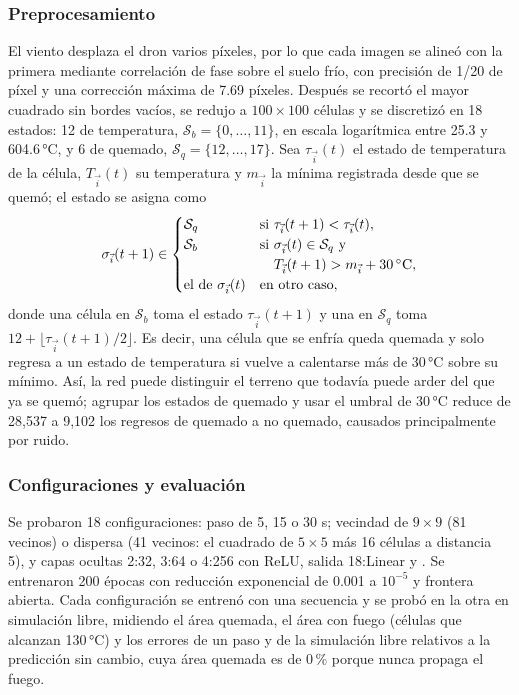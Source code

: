 \subsubsection{Preprocesamiento}
El viento desplaza el dron varios píxeles, por lo que cada imagen se alineó con la primera mediante correlación de fase sobre el suelo frío, con precisión de 1/20 de píxel y una corrección máxima de 7.69 píxeles. Después se recortó el mayor cuadrado sin bordes vacíos, se redujo a $100\times100$ células y se discretizó en 18 estados: 12 de temperatura, $\mathcal{S}_b = \{0, \dots, 11\}$, en escala logarítmica entre 25.3 y 604.6\,°C, y 6 de quemado, $\mathcal{S}_q = \{12, \dots, 17\}$. Sea $\tau_{\vec{i}}(t)$ el estado de temperatura de la célula, $T_{\vec{i}}(t)$ su temperatura y $m_{\vec{i}}$ la mínima registrada desde que se quemó; el estado se asigna como
\begin{equation}
	\sigma_{\vec{i}}(t+1) \in
	\begin{cases}
		\mathcal{S}_q & \text{si } \tau_{\vec{i}}(t+1) < \tau_{\vec{i}}(t), \\
		\mathcal{S}_b & \text{si } \sigma_{\vec{i}}(t) \in \mathcal{S}_q \text{ y} \\
		& \hphantom{\text{si }} T_{\vec{i}}(t+1) > m_{\vec{i}} + 30\,^\circ\mathrm{C}, \\
		\text{el de } \sigma_{\vec{i}}(t) & \text{en otro caso},
	\end{cases}
	\label{eq:flame_estados}
\end{equation}
donde una célula en $\mathcal{S}_b$ toma el estado $\tau_{\vec{i}}(t+1)$ y una en $\mathcal{S}_q$ toma $12 + \lfloor \tau_{\vec{i}}(t+1)/2 \rfloor$. Es decir, una célula que se enfría queda quemada y solo regresa a un estado de temperatura si vuelve a calentarse más de 30\,°C sobre su mínimo. Así, la red puede distinguir el terreno que todavía puede arder del que ya se quemó; agrupar los estados de quemado y usar el umbral de 30\,°C reduce de 28,537 a 9,102 los regresos de quemado a no quemado, causados principalmente por ruido. 


\subsubsection{Configuraciones y evaluación}
Se probaron 18 configuraciones: paso de 5, 15 o 30 s; vecindad de $9\times9$ (81 vecinos) o dispersa (41 vecinos: el cuadrado de $5\times5$ más 16 células a distancia 5), y capas ocultas 2:32, 3:64 o 4:256 con ReLU, salida 18:Linear y \onehot{}. Se entrenaron 200 épocas con reducción exponencial de 0.001 a $10^{-5}$ y frontera abierta. Cada configuración se entrenó con una secuencia y se probó en la otra en simulación libre, midiendo el área quemada, el área con fuego (células que alcanzan 130\,°C) y los errores de un paso y de la simulación libre relativos a la predicción sin cambio, cuya área quemada es de 0\,\% porque nunca propaga el fuego.

